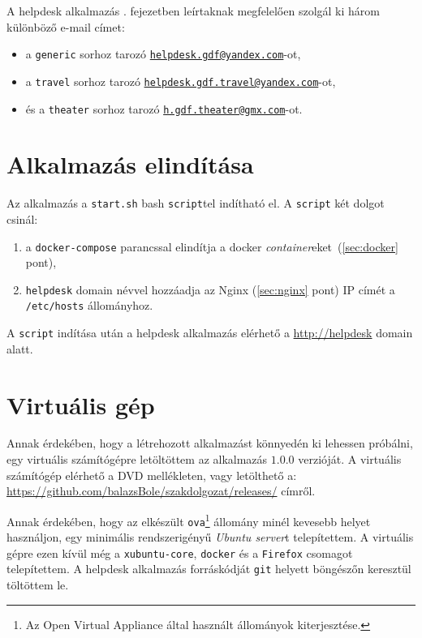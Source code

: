 A helpdesk alkalmazás . fejezetben leírtaknak megfelelően szolgál ki három különböző e-mail címet:

\begin{itemize}
	\item a \texttt{generic} sorhoz tarozó  \href{mailto:helpdesk.gdf@yandex.com}{\nolinkurl{helpdesk.gdf@yandex.com}}-ot, 
	\item a \texttt{travel} sorhoz tarozó  \href{mailto:helpdesk.gdf.travel@yandex.com}{\nolinkurl{helpdesk.gdf.travel@yandex.com}}-ot,
	\item és a \texttt{theater} sorhoz tarozó  \href{mailto:h.gdf.theater@gmx.com}{\nolinkurl{h.gdf.theater@gmx.com}}-ot.
\end{itemize}



\section{Alkalmazás elindítása}\label{sec:elinditas}
Az alkalmazás a \texttt{start.sh} bash \texttt{script}tel indítható el. A \texttt{script} két dolgot csinál:
\begin{enumerate}
	\item a \texttt{docker-compose} parancssal elindítja a docker \emph{container}eket~(\ref{sec:docker} pont),
	\item  \texttt{helpdesk} domain névvel hozzáadja az Nginx (\ref{sec:nginx} pont) IP címét a \mbox{\texttt{/etc/hosts}} állományhoz.
\end{enumerate}

A \texttt{script} indítása után a helpdesk alkalmazás elérhető a \href{http://helpdesk}{http://helpdesk} domain alatt.

\section{Virtuális gép}
Annak érdekében, hogy a létrehozott alkalmazást könnyedén ki lehessen próbálni, egy virtuális számítógépre letöltöttem az alkalmazás $1.0.0$ verzióját. A virtuális számítógép elérhető a DVD mellékleten, vagy letölthető a: \\
\href{https://github.com/balazsBole/szakdolgozat/releases/}{https://github.com/balazsBole/szakdolgozat/releases/} címről.

Annak érdekében, hogy az elkészült \texttt{ova}\footnote{Az Open Virtual Appliance által használt állományok kiterjesztése.} állomány minél kevesebb helyet használjon, egy minimális rendszerigényű \emph{Ubuntu server}t telepítettem. A virtuális gépre ezen kívül még a \texttt{xubuntu-core}, \texttt{docker} és a \texttt{Firefox} csomagot telepítettem. A helpdesk alkalmazás forráskódját \texttt{git} helyett böngészőn keresztül töltöttem le.

